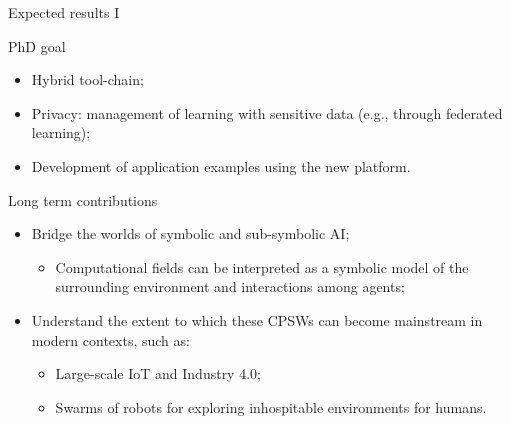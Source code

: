 \documentclass[presentation]{beamer}\mode<presentation>{\usetheme{AMSBolognaFC}}
\begin{document}

	


\begin{frame}[c]{Expected results I}


\begin{block}{PhD goal}
	\begin{itemize}
		\item Hybrid tool-chain;
		\item Privacy: management of learning with sensitive data 
			(e.g., through federated learning);
		\item Development of application examples using the new platform.
	\end{itemize}
\end{block}

\begin{alertblock}{Long term contributions}
	\begin{itemize}
		\item Bridge the worlds of symbolic and sub-symbolic AI;
		\begin{itemize}
			\item Computational fields can be interpreted as a symbolic model 
				of the surrounding environment and interactions among agents;
		\end{itemize}
		\item Understand the extent to which these CPSWs can 
			become mainstream in modern contexts, such as:
		\begin{itemize}
			\item Large-scale IoT and Industry 4.0;
			\item Swarms of robots for exploring inhospitable environments for humans.
		\end{itemize}
	\end{itemize}
\end{alertblock}

\end{frame}
\end{document}
